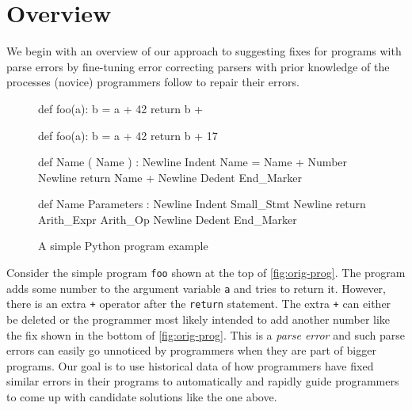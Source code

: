 \section{Overview}
\label{sec:overview}

We begin with an overview of our approach to suggesting fixes for programs with
parse errors by fine-tuning error correcting parsers with prior knowledge of the
processes (novice) programmers follow to repair their errors.

\begin{figure}[h]
\centering
\begin{minipage}[c]{0.38\linewidth}
\begin{ecode}
def foo(a):
  b = a + 42
  return b +
\end{ecode}

\begin{ecode}
def foo(a):
  b = a + 42
  return b + 17
\end{ecode}
\label{fig:orig-prog}
\end{minipage}%
\hspace{0.02\linewidth}%
\begin{minipage}[c]{0.58\linewidth}
\begin{ecode}
def Name ( Name ) : Newline
Indent Name = Name + Number Newline
return Name + Newline
Dedent End_Marker
\end{ecode}

\begin{ecode}
def Name Parameters : Newline
Indent Small_Stmt Newline
return Arith_Expr Arith_Op Newline
Dedent End_Marker
\end{ecode}
\label{fig:abstract-prog}
\end{minipage}
\caption{A simple Python program example}
\end{figure}


 Consider the simple program \texttt{foo} shown at the top
of \autoref{fig:orig-prog}. The program adds some number to the argument variable
\texttt{a} and tries to return it. However, there is an extra \texttt{+}
operator after the \texttt{return} statement. The extra \texttt{+} can either be
deleted or the programmer most likely intended to add another number like the
fix shown in the bottom of \autoref{fig:orig-prog}. This is a \emph{parse error}
and such parse errors can easily go unnoticed \citep{?} by programmers when they
are part of bigger programs.
%
Our goal is to use historical data of how programmers have fixed similar errors
in their programs to automatically and rapidly guide programmers to come up with
candidate solutions like the one above.


